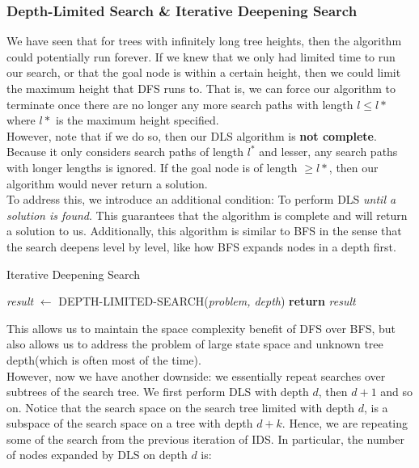 \documentclass[12pt]{article}
\begin{document}
\subsubsection{Depth-Limited Search \& Iterative Deepening Search}

We have seen that for trees with infinitely long tree heights, then the algorithm could potentially run forever. If we knew that we only had limited time to run our search, or that the goal node is within a certain height, then we could limit the maximum height that DFS runs to. That is, we can force our algorithm to terminate once there are no longer any more search paths with length $l \leq l*$ where $l*$ is the maximum height specified.\\

However, note that if we do so, then our DLS algorithm is \textbf{not complete}. Because it only considers search paths of length $l^*$ and lesser, any search paths with longer lengths is ignored. If the goal node is of length $\geq l*$, then our algorithm would never return a solution.\\

To address this, we introduce an additional condition: To perform DLS \textit{until a solution is found}. This guarantees that the algorithm is complete and will return a solution to us. Additionally, this algorithm is similar to BFS in the sense that the search deepens level by level, like how BFS expands nodes in a depth first.

\begin{algorithm}
\caption{Iterative Deepening Search}\label{euclid}
\begin{algorithmic}[1]
	\State \textit{result} $\leftarrow$ DEPTH-LIMITED-SEARCH(\textit{problem, depth})
		\State \textbf{return} \textit{result}
	\EndIf
\EndFor
\end{algorithmic}
\end{algorithm}

This allows us to maintain the space complexity benefit of DFS over BFS, but also allows us to address the problem of large state space and unknown tree depth(which is often most of the time).\\

However, now we have another downside: we essentially repeat searches over subtrees of the search tree. We first perform DLS with depth $d$, then $d + 1$ and so on. Notice that the search space on the search tree limited with depth $d$, is a subspace of the search space on a tree with depth $d + k$. Hence, we are repeating some of the search from the previous iteration of IDS. In particular, the number of nodes expanded by DLS on depth $d$ is:
\end{document}
